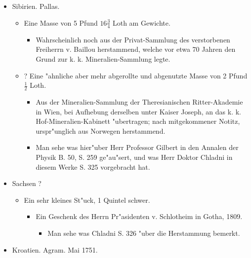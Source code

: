\documentclass[a4paper, 11pt, oneside, polutonikogreek, german]{article}
\begin{document}
\subsection{}
\begin{itemize}
    \item Sibirien. Pallas.
    \begin{itemize}
        \item Eine Masse von 5 Pfund $\mathfrak{16\frac{3}{4}}$ Loth am Gewichte.
        \begin{itemize}
            \item Wahrscheinlich noch aus der Privat-Sammlung des verstorbenen Freiherrn v. Baillou herstammend, welche vor etwa 70 Jahren den Grund zur k. k. Mineralien-Sammlung legte.
        \end{itemize}
        \item ? Eine "ahnliche aber mehr abgerollte und abgenutzte Masse von 2 Pfund $\mathfrak{\frac{1}{2}}$ Loth.
        \begin{itemize}
            \item Aus der Mineralien-Sammlung der Theresianischen Ritter-Akademie in Wien, bei Aufhebung derselben unter Kaiser Joseph, an das k. k. Hof-Mineralien-Kabinett "ubertragen; nach mitgekommener Notitz, urspr"unglich aus Norwegen herstammend.
            \item Man sehe was hier"uber Herr Professor Gilbert in den Annalen der Physik B. 50, S. 259 ge"au"sert, und was Herr Doktor Chladni in diesem Werke S. 325 vorgebracht hat.
        \end{itemize}
    \end{itemize}
    \item Sachsen ?
    \begin{itemize}
        \item Ein sehr kleines St"uck, 1 Quintel schwer.
        \begin{itemize}
            \item Ein Geschenk des Herrn Pr"asidenten v. Schlotheim in Gotha, 1809.
            \begin{itemize}
                \item Man sehe was Chladni S. 326 "uber die Herstammung bemerkt.
            \end{itemize}
        \end{itemize}
    \end{itemize}
    \item Kroatien. Agram. Mai 1751.
    \begin{itemize}

\end{itemize}
\end{itemize}
\end{document}
